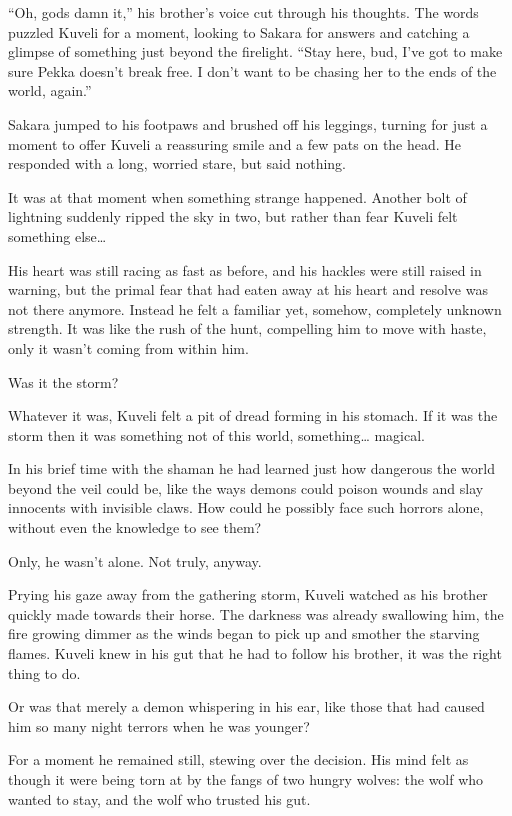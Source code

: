 ``Oh, gods damn it,'' his brother's voice cut through his thoughts. The words puzzled Kuveli for a moment, looking to Sakara for answers and catching a glimpse of something just beyond the firelight. ``Stay here, bud, I've got to make sure Pekka doesn't break free. I don't want to be chasing her to the ends of the world, again.''

Sakara jumped to his footpaws and brushed off his leggings, turning for just a moment to offer Kuveli a reassuring smile and a few pats on the head. He responded with a long, worried stare, but said nothing.

It was at that moment when something strange happened. Another bolt of lightning suddenly ripped the sky in two, but rather than fear Kuveli felt something else\ldots{}

His heart was still racing as fast as before, and his hackles were still raised in warning, but the primal fear that had eaten away at his heart and resolve was not there anymore. Instead he felt a familiar yet, somehow, completely unknown strength. It was like the rush of the hunt, compelling him to move with haste, only it wasn't coming from within him.

Was it the storm?

Whatever it was, Kuveli felt a pit of dread forming in his stomach. If it was the storm then it was something not of this world, something\ldots{} magical.

In his brief time with the shaman he had learned just how dangerous the world beyond the veil could be, like the ways demons could poison wounds and slay innocents with invisible claws. How could he possibly face such horrors alone, without even the knowledge to see them?

Only, he wasn't alone. Not truly, anyway.

Prying his gaze away from the gathering storm, Kuveli watched as his brother quickly made towards their horse. The darkness was already swallowing him, the fire growing dimmer as the winds began to pick up and smother the starving flames. Kuveli knew in his gut that he had to follow his brother, it was the right thing to do.

Or was that merely a demon whispering in his ear, like those that had caused him so many night terrors when he was younger?

For a moment he remained still, stewing over the decision. His mind felt as though it were being torn at by the fangs of two hungry wolves: the wolf who wanted to stay, and the wolf who trusted his gut.

